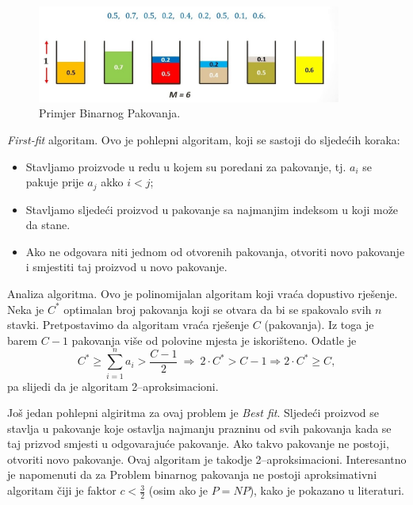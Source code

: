 \documentclass[a4paper, utf8, 11pt, colorlinks]{book}
\begin{document}
\begin{figure}
	\centering
	\includegraphics[width=100mm]{maxresdefault.eps}%
	\caption{Primjer Binarnog Pakovanja.}
    \label{fig:bin-packing}
\end{figure}
 \emph{First-fit} algoritam. Ovo je pohlepni algoritam, koji se sastoji do sljedećih koraka:
\begin{itemize}
	\item Stavljamo proizvode u redu u kojem su poredani za pakovanje, tj. $a_i$ se pakuje prije $a_j$ akko $i < j$;
	\item Stavljamo sljedeći proizvod u pakovanje sa najmanjim indeksom u koji može da stane. \item Ako ne odgovara niti jednom od otvorenih pakovanja, otvoriti novo pakovanje i smjestiti taj proizvod u novo pakovanje.
\end{itemize}


\noindent Analiza algoritma. Ovo je polinomijalan algoritam koji vraća dopustivo rješenje.  Neka je $C^*$ optimalan broj pakovanja koji se otvara da bi se spakovalo svih $n$ stavki. Pretpostavimo da algoritam vraća rješenje $C$ (pakovanja). Iz toga je barem $C-1$ pakovanja više od polovine mjesta je iskorišteno. Odatle je
$$C^* \geq \sum_{i=1}^n a_i > \frac{C-1}{2}\ \Rightarrow\  2 \cdot C^* > C-1 \Rightarrow 2 \cdot C^* \geq C,$$
pa slijedi da je algoritam 2--aproksimacioni. 

 Još jedan pohlepni algiritma za ovaj problem je \emph{Best fit}. Sljedeći proizvod se stavlja u pakovanje koje ostavlja najmanju prazninu od svih pakovanja kada se taj prizvod smjesti u odgovarajuće pakovanje. Ako takvo pakovanje ne postoji, otvoriti novo pakovanje. 
Ovaj algoritam je takodje 2--aproksimacioni. Interesantno je napomenuti da za Problem binarnog pakovanja ne postoji aproksimativni algoritam čiji je faktor $c <\frac{3}{2}$ (osim ako je $P=NP$), kako je pokazano u literaturi. 
\end{document}
